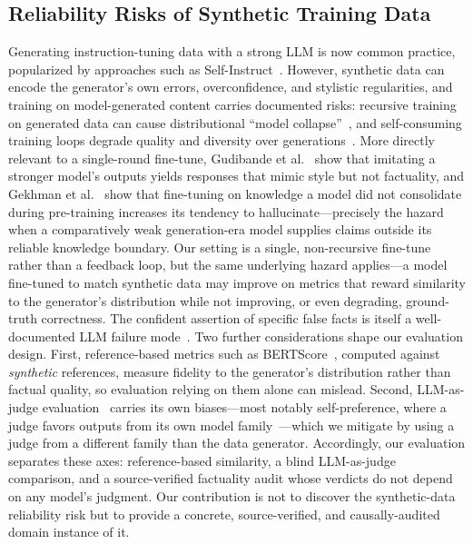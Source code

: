 \documentclass[11pt, a4paper]{article}
\begin{document}
\subsection{Reliability Risks of Synthetic Training Data}
Generating instruction-tuning data with a strong LLM is now common practice, popularized by approaches such as Self-Instruct~\cite{wang2022}. However, synthetic data can encode the generator's own errors, overconfidence, and stylistic regularities, and training on model-generated content carries documented risks: recursive training on generated data can cause distributional ``model collapse''~\cite{shumailov2024}, and self-consuming training loops degrade quality and diversity over generations~\cite{alemohammad2023}. More directly relevant to a single-round fine-tune, Gudibande et al.~\cite{gudibande2023} show that imitating a stronger model's outputs yields responses that mimic style but not factuality, and Gekhman et al.~\cite{gekhman2024} show that fine-tuning on knowledge a model did not consolidate during pre-training increases its tendency to hallucinate---precisely the hazard when a comparatively weak generation-era model supplies claims outside its reliable knowledge boundary. Our setting is a single, non-recursive fine-tune rather than a feedback loop, but the same underlying hazard applies---a model fine-tuned to match synthetic data may improve on metrics that reward similarity to the generator's distribution while not improving, or even degrading, ground-truth correctness. The confident assertion of specific false facts is itself a well-documented LLM failure mode~\cite{ji2023}. Two further considerations shape our evaluation design. First, reference-based metrics such as BERTScore~\cite{zhang2020}, computed against \emph{synthetic} references, measure fidelity to the generator's distribution rather than factual quality, so evaluation relying on them alone can mislead. Second, LLM-as-judge evaluation~\cite{zheng2023} carries its own biases---most notably self-preference, where a judge favors outputs from its own model family~\cite{panickssery2024}---which we mitigate by using a judge from a different family than the data generator. Accordingly, our evaluation separates these axes: reference-based similarity, a blind LLM-as-judge comparison, and a source-verified factuality audit whose verdicts do not depend on any model's judgment. Our contribution is not to discover the synthetic-data reliability risk but to provide a concrete, source-verified, and causally-audited domain instance of it.
\end{document}
